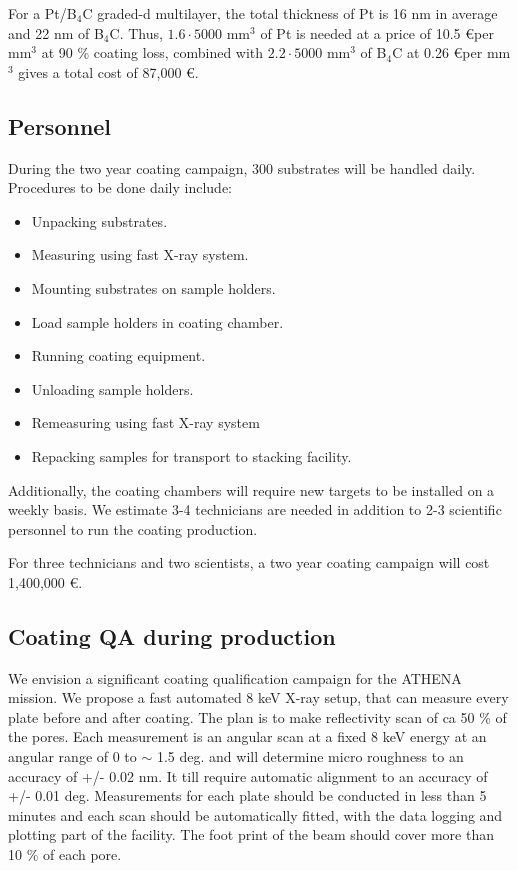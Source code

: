 For a Pt/B$_4$C graded-d multilayer, the total thickness of Pt is 16 nm in average and 22 nm of B$_4$C. Thus, $1.6 \cdot 5000$ mm$^3$ of Pt is needed at a price of 10.5 \euro per mm$^3$ at 90 \% coating loss, combined with $2.2 \cdot 5000$ mm$^3$ of B$_4$C at 0.26 \euro per mm$^3$ gives a total cost of 87,000 \euro.

\subsection{Personnel}
During the two year coating campaign, 300 substrates will be handled daily. Procedures to be done daily include:

\begin{itemize}[itemsep=1.5pt,parsep=1pt]
	\item Unpacking substrates.
	\item Measuring using fast X-ray system.
	\item Mounting substrates on sample holders.
	\item Load sample holders in coating chamber.
	\item Running coating equipment.
	\item Unloading sample holders.
	\item Remeasuring using fast X-ray system
	\item Repacking samples for transport to stacking facility.
\end{itemize}

Additionally, the coating chambers will require new targets to be installed on a weekly basis. We estimate 3-4 technicians are needed in addition to 2-3 scientific personnel to run the coating production.

For three technicians and two scientists, a two year coating campaign will cost 1,400,000 \euro.


\subsection{Coating QA during production}\label{qualification}
We envision a significant coating qualification campaign for the ATHENA mission. We propose a fast automated 8 keV X-ray setup, that can measure every plate before and after coating. The plan is to make reflectivity scan of ca 50 \% of the pores.  Each measurement is an angular scan  at a fixed 8 keV energy at an angular range of 0 to $\sim$ 1.5 deg. and will determine micro roughness to an accuracy of +/- 0.02 nm. It till require automatic alignment to an accuracy of +/- 0.01 deg. Measurements for each plate should be conducted in less than 5 minutes and each scan should be automatically fitted, with the data logging and plotting part of the facility. The foot print of the beam should cover more than 10 \% of each pore.


